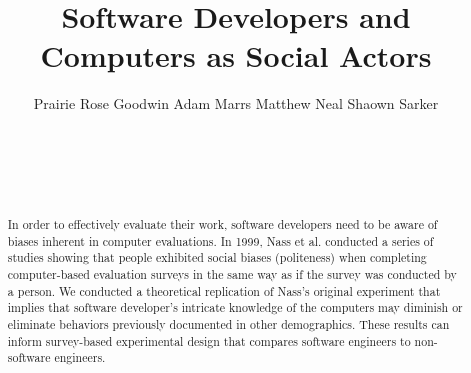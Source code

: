 \documentclass{sig-alternate-05-2015}
\begin{document}


\doi{}

\isbn{}


%

\title{Software Developers and Computers as Social Actors}
%

%
\author{Prairie Rose Goodwin \qquad Adam Marrs \qquad Matthew Neal \qquad Shaown Sarker\\ \\ \\ \\ \\}


\maketitle
\begin{abstract}
In order to effectively evaluate their work, software developers need to be aware of biases inherent in computer evaluations.  In 1999, Nass et al. conducted a series of studies showing that people exhibited social biases (politeness) when completing computer-based evaluation surveys in the same way as if the survey was conducted by a person.  We conducted a theoretical replication of Nass's original experiment that implies that software developer's intricate knowledge of the computers may diminish or eliminate behaviors previously documented in other demographics.  These results can inform survey-based experimental design that compares software engineers to non-software engineers.  
\end{abstract}
\end{document}
